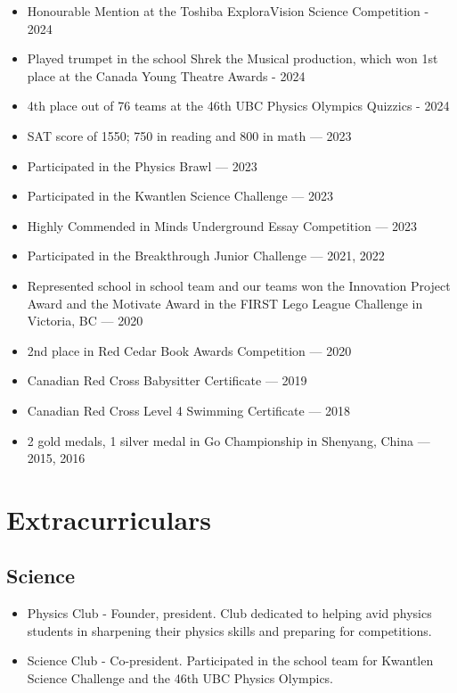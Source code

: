 \documentclass{article}
\begin{document}
\begin{itemize}
	\item Honourable Mention at the Toshiba ExploraVision Science Competition - 2024
	\item Played trumpet in the school Shrek the Musical production, which won 1st place at the Canada Young Theatre Awards - 2024
	\item 4th place out of 76 teams at the 46th UBC Physics Olympics Quizzics - 2024
	\item SAT score of 1550; 750 in reading and 800 in math — 2023
	\item Participated in the Physics Brawl — 2023
	\item Participated in the Kwantlen Science Challenge — 2023
	\item Highly Commended in Minds Underground Essay Competition — 2023
	\item Participated in the Breakthrough Junior Challenge — 2021, 2022
	\item Represented school in school team and our teams won the Innovation Project Award and the Motivate Award in the FIRST Lego League Challenge in Victoria, BC — 2020
	\item 2nd place in Red Cedar Book Awards Competition — 2020
	\item Canadian Red Cross Babysitter Certificate — 2019
	\item Canadian Red Cross Level 4 Swimming Certificate — 2018
	\item 2 gold medals, 1 silver medal in Go Championship in Shenyang, China — 2015, 2016
\end{itemize}

\section*{Extracurriculars}

\subsection*{Science}

\begin{itemize}
	\item Physics Club - Founder, president. Club dedicated to helping avid physics students in sharpening their physics skills and preparing for competitions.
	\item Science Club - Co-president. Participated in the school team for Kwantlen Science Challenge and the 46th UBC Physics Olympics.
\end{itemize}
\end{document}
